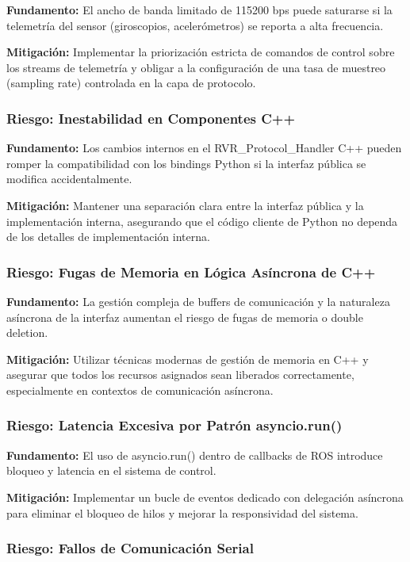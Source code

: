 \documentclass[11pt]{article}
\newcommand{\code}[1]{\textcolor{codeblue}{\url{#1}}}
\numberwithin{figure}{section}
\numberwithin{table}{section}
\def\code#1{#1}%
\begin{document}
\textbf{Fundamento:} El ancho de banda limitado de 115200 bps puede saturarse si la telemetría del sensor (giroscopios, acelerómetros) se reporta a alta frecuencia.

\textbf{Mitigación:} Implementar la priorización estricta de comandos de control sobre los streams de telemetría y obligar a la configuración de una tasa de muestreo (sampling rate) controlada en la capa de protocolo.


\subsubsection{Riesgo: Inestabilidad en Componentes C++}

\textbf{Fundamento:} Los cambios internos en el \code{RVR\_Protocol\_Handler} C++ pueden romper la compatibilidad con los bindings Python si la interfaz pública se modifica accidentalmente.

\textbf{Mitigación:} Mantener una separación clara entre la interfaz pública y la implementación interna, asegurando que el código cliente de Python no dependa de los detalles de implementación interna.


\subsubsection{Riesgo: Fugas de Memoria en Lógica Asíncrona de C++}

\textbf{Fundamento:} La gestión compleja de buffers de comunicación y la naturaleza asíncrona de la interfaz aumentan el riesgo de fugas de memoria o double deletion.

\textbf{Mitigación:} Utilizar técnicas modernas de gestión de memoria en C++ y asegurar que todos los recursos asignados sean liberados correctamente, especialmente en contextos de comunicación asíncrona.


\subsubsection{Riesgo: Latencia Excesiva por Patrón asyncio.run()}

\textbf{Fundamento:} El uso de \code{asyncio.run()} dentro de callbacks de ROS introduce bloqueo y latencia en el sistema de control.

\textbf{Mitigación:} Implementar un bucle de eventos dedicado con delegación asíncrona para eliminar el bloqueo de hilos y mejorar la responsividad del sistema.


\subsubsection{Riesgo: Fallos de Comunicación Serial}
\end{document}
